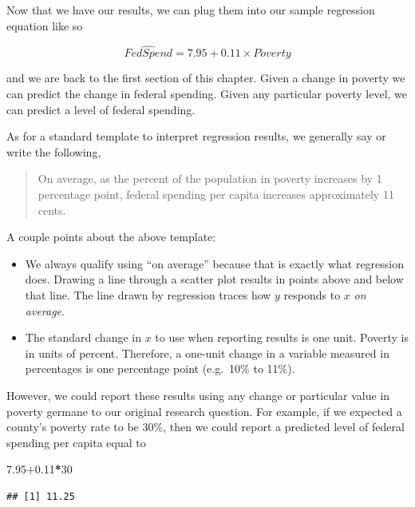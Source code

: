 \documentclass[
]{book}
\newenvironment{Shaded}{\begin{snugshade}}{\end{snugshade}}
\newcommand{\DecValTok}[1]{\textcolor[rgb]{0.00,0.00,0.81}{#1}}
\newcommand{\FloatTok}[1]{\textcolor[rgb]{0.00,0.00,0.81}{#1}}
\newcommand{\OperatorTok}[1]{\textcolor[rgb]{0.81,0.36,0.00}{\textbf{#1}}}
\providecommand{\tightlist}{%
  \setlength{\itemsep}{0pt}\setlength{\parskip}{0pt}}
\begin{document}
Now that we have our results, we can plug them into our sample regression equation like so

\begin{equation}
\hat{FedSpend}=7.95+0.11 \times Poverty
\label{eq:simregresults}
\end{equation}

and we are back to the first section of this chapter. Given a change in poverty we can predict the change in federal spending. Given any particular poverty level, we can predict a level of federal spending.

As for a standard template to interpret regression results, we generally say or write the following,

\begin{quote}
On average, as the percent of the population in poverty increases by 1 percentage point, federal spending per capita increases approximately 11 cents.
\end{quote}

A couple points about the above template:

\begin{itemize}
\tightlist
\item
  We always qualify using ``on average'' because that is exactly what regression does. Drawing a line through a scatter plot results in points above and below that line. The line drawn by regression traces how \(y\) responds to \(x\) \emph{on average}.
\item
  The standard change in \(x\) to use when reporting results is one unit. Poverty is in units of percent. Therefore, a one-unit change in a variable measured in percentages is one percentage point (e.g.~10\% to 11\%).
\end{itemize}

However, we could report these results using any change or particular value in poverty germane to our original research question. For example, if we expected a county's poverty rate to be 30\%, then we could report a predicted level of federal spending per capita equal to

\begin{Shaded}
\begin{Highlighting}[]
\FloatTok{7.95+0.11}\OperatorTok{*}\DecValTok{30}
\end{Highlighting}
\end{Shaded}

\begin{verbatim}
## [1] 11.25
\end{verbatim}
\end{document}
